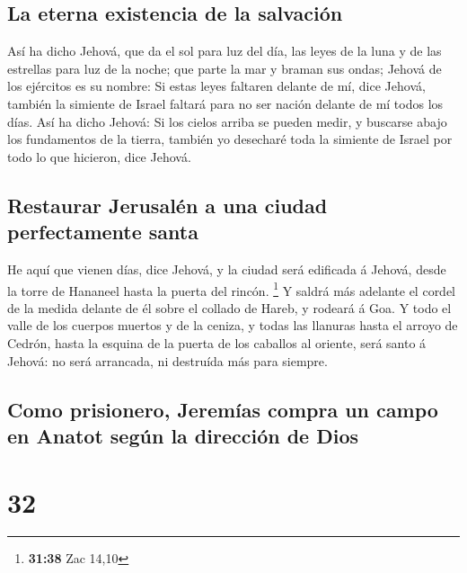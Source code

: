 \hypertarget{la-eterna-existencia-de-la-salvaciuxf3n}{%
\subsection{La eterna existencia de la
salvación}\label{la-eterna-existencia-de-la-salvaciuxf3n}}

 Así ha dicho Jehová, que da el sol para luz del día, las
leyes de la luna y de las estrellas para luz de la noche; que parte la
mar y braman sus ondas; Jehová de los ejércitos es su nombre:
 Si estas leyes faltaren delante de mí, dice Jehová,
también la simiente de Israel faltará para no ser nación delante de mí
todos los días.  Así ha dicho Jehová: Si los cielos arriba
se pueden medir, y buscarse abajo los fundamentos de la tierra, también
yo desecharé toda la simiente de Israel por todo lo que hicieron, dice
Jehová.

\hypertarget{restaurar-jerusaluxe9n-a-una-ciudad-perfectamente-santa}{%
\subsection{Restaurar Jerusalén a una ciudad perfectamente
santa}\label{restaurar-jerusaluxe9n-a-una-ciudad-perfectamente-santa}}

 He aquí que vienen días, dice Jehová, y la ciudad será
edificada á Jehová, desde la torre de Hananeel hasta la puerta del
rincón. \footnote{\textbf{31:38} Zac 14,10}  Y saldrá más
adelante el cordel de la medida delante de él sobre el collado de Hareb,
y rodeará á Goa.  Y todo el valle de los cuerpos muertos y
de la ceniza, y todas las llanuras hasta el arroyo de Cedrón, hasta la
esquina de la puerta de los caballos al oriente, será santo á Jehová: no
será arrancada, ni destruída más para siempre.

\hypertarget{como-prisionero-jeremuxedas-compra-un-campo-en-anatot-seguxfan-la-direcciuxf3n-de-dios}{%
\subsection{Como prisionero, Jeremías compra un campo en Anatot según la
dirección de
Dios}\label{como-prisionero-jeremuxedas-compra-un-campo-en-anatot-seguxfan-la-direcciuxf3n-de-dios}}

\hypertarget{section-31}{%
\section{32}\label{section-31}}


